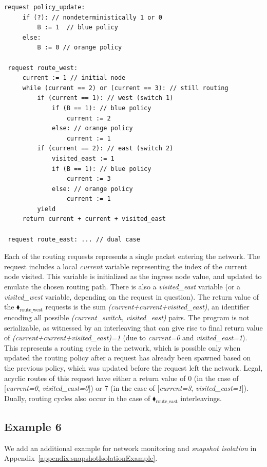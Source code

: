 \begin{center}
\begin{minipage}[!htbp]{0.85\textwidth}
	\begin{lstlisting}[caption={BGP routing (non serializable)},label={lst:BgpNonSerializable}]
 request policy_update:
     if (?): // nondeterministically 1 or 0
         B := 1  // blue policy 
     else:
         B := 0 // orange policy
		
 request route_west:
     current := 1 // initial node
     while (current == 2) or (current == 3): // still routing        
         if (current == 1): // west (switch 1)
             if (B == 1): // blue policy
                 current := 2
             else: // orange policy
                 current := 1
         if (current == 2): // east (switch 2)
             visited_east := 1
             if (B == 1): // blue policy
                 current := 3
             else: // orange policy
                 current := 1
         yield
     return current + current + visited_east
     
 request route_east: ... // dual case      
		\end{lstlisting}
\end{minipage}
\end{center}


Each of the routing requests represents a single packet entering the network. The request includes a local \textit{current} variable representing the index of the current node visited. This variable is initialized as the ingress node value, and updated to emulate the chosen routing path. There is also a \textit{visited\_east} variable (or a \textit{visited\_west} variable, depending on the request in question).
%
The return value of the {\color{ForestGreen}$\blacklozenge_\text{route\_west}$} requests is the sum \textit{(current+current+visited\_east)}, an identifier encoding all possible \textit{(current\_switch, visited\_east)} pairs.
%
The program is not serializable, as witnessed by an interleaving that can give rise to final return value of \textit{(current+current+visited\_east)=1} (due to \textit{current=0} and \textit{visited\_east=1}). This represents a routing cycle in the network, which is possible only when updated the routing policy after a request has already been spawned based on the previous policy, which was updated before the request left the network.
Legal, acyclic routes of this request have either a return value of 0 (in the case of [\textit{current=0}, \textit{visited\_east=0}]) or 7 (in the case of [\textit{current=3}, \textit{visited\_east=1}]).
Dually, routing cycles also occur in the case of {\color{ForestGreen}$\blacklozenge_\text{route\_east}$} interleavings.


\subsection{Example 6}

We add an additional example for network monitoring and \textit{snapshot isolation} in Appendix~\ref{appendix:snapshotIsolationExample}.%



